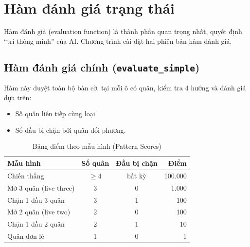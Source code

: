 \documentclass[12pt,a4paper]{article}
\begin{document}
\section{Hàm đánh giá trạng thái}

Hàm đánh giá (evaluation function) là thành phần quan trọng nhất, quyết định ``trí thông minh'' của AI. Chương trình cài đặt hai phiên bản hàm đánh giá.

\subsection{Hàm đánh giá chính (\texttt{evaluate\_simple})}

Hàm này duyệt toàn bộ bàn cờ, tại mỗi ô có quân, kiểm tra 4 hướng và đánh giá dựa trên:
\begin{itemize}
    \item Số quân liên tiếp cùng loại.
    \item Số đầu bị chặn bởi quân đối phương.
\end{itemize}

\begin{table}[H]
\centering
\caption{Bảng điểm theo mẫu hình (Pattern Scores)}
\begin{tabular}{lccr}
\toprule
\textbf{Mẫu hình} & \textbf{Số quân} & \textbf{Đầu bị chặn} & \textbf{Điểm} \\
\midrule
Chiến thắng            & $\geq 4$ & bất kỳ & 100.000 \\
Mở 3 quân (live three) & 3        & 0      & 1.000   \\
Chặn 1 đầu 3 quân     & 3        & 1      & 100     \\
Mở 2 quân (live two)   & 2        & 0      & 100     \\
Chặn 1 đầu 2 quân     & 2        & 1      & 10      \\
Quân đơn lẻ            & 1        & 0      & 1       \\
\bottomrule
\end{tabular}
\end{table}
\end{document}
